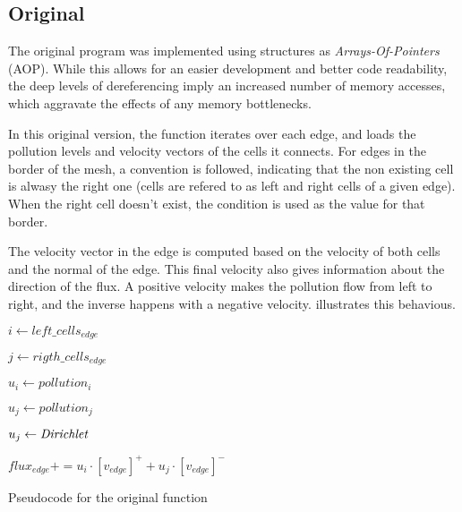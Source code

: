 \subsection{Original}
\label{sec:original}

The original \polu program was implemented using structures as \textit{Arrays-Of-Pointers} (AOP). While this allows for an easier development and better code readability, the deep levels of dereferencing imply an increased number of memory accesses, which aggravate the effects of any memory bottlenecks.

In this original version, the \computeflux function iterates over each edge, and loads the pollution levels and velocity vectors of the cells it connects. For edges in the border of the mesh, a convention is followed, indicating that the non existing cell is alwasy the right one (cells are refered to as left and right cells of a given edge). When the right cell doesn't exist, the \dirichlet condition is used as the value for that border.

The velocity vector in the edge is computed based on the velocity of both cells and the normal of the edge. This final velocity also gives information about the direction of the flux. A positive velocity makes the pollution flow from left to right, and the inverse happens with a negative velocity.  illustrates this behavious.



\begin{algorithm}[!htp]
	\begin{algorithmic}

			$i     \gets left\_cells_{edge}$

			$j     \gets rigth\_cells_{edge}$

			$u_{i} \gets pollution_{i}$


				$u_{j} \gets pollution_{j}$
			\Else

				$u_{j} \gets \textit{Dirichlet}$
			\EndIf


			$flux_{edge} += u_{i} \cdot [v_{edge}]^{+} + u_{j} \cdot [v_{edge}]^{-}$
		\EndFor
	\end{algorithmic}

	\caption{Pseudocode for the original \computeflux function}
	\label{alg:flux}
\end{algorithm}

